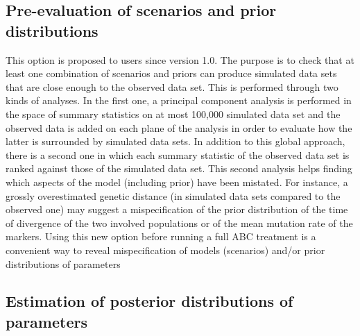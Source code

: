 \subsection{Pre-evaluation of scenarios and prior distributions}

This option is proposed to users since version 1.0. The purpose is
to check that at least one combination of scenarios and priors can
produce simulated data sets that are close enough to the observed
data set. This is performed through two kinds of analyses. In the
first one, a principal component analysis is performed in the space
of summary statistics on at most 100,000 simulated data set and the
observed data is added on each plane of the analysis in order to evaluate
how the latter is surrounded by simulated data sets. In addition to
this global approach, there is a second one in which each summary
statistic of the observed data set is ranked against those of the
simulated data set. This second analysis helps finding which aspects
of the model (including prior) have been mistated. For instance, a
grossly overestimated genetic distance (in simulated data sets compared
to the observed one) may suggest a mispecification of the prior distribution
of the time of divergence of the two involved populations or of the
mean mutation rate of the markers. Using this new option before running
a full ABC treatment is a convenient way to reveal mispecification
of models (scenarios) and/or prior distributions of parameters \citep[see][for an illustration]{C2010}


\subsection{Estimation of posterior distributions of parameters}

